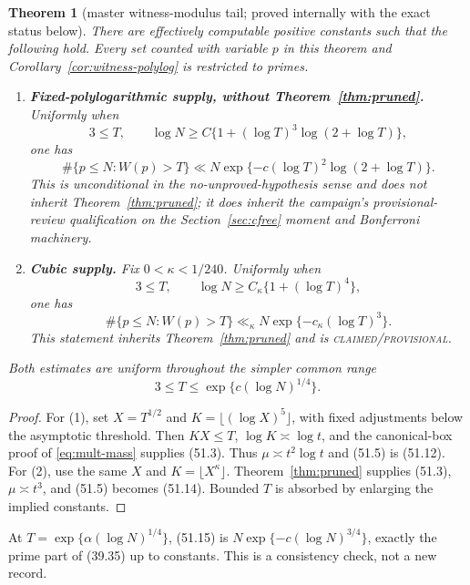 \documentclass[10pt,reqno]{amsart}
\newtheorem{theorem}{Theorem}[section]
\theoremstyle{definition}
\newcommand{\1}{\mathbf 1}
\begin{document}
\begin{theorem}[master witness-modulus tail; proved internally with the
exact status below]\label{thm:witness-tail}
There are effectively computable positive constants such that the following
hold.  Every set counted with variable $p$ in this theorem and
Corollary~\ref{cor:witness-polylog} is restricted to primes.
\begin{enumerate}[leftmargin=*,label=\arabic*.]
\item \textbf{Fixed-polylogarithmic supply, without
Theorem~\ref{thm:pruned}.}  Uniformly when
\begin{equation}\tag{51.12}
 3\leq T,\qquad
 \log N\geq C\{1+(\log T)^3\log(2+\log T)\},
\end{equation}
one has
\begin{equation}\tag{51.13}
 \#\{p\leq N:W(p)>T\}
 \ll N\exp\{-c(\log T)^2\log(2+\log T)\}.
\end{equation}
This is unconditional in the no-unproved-hypothesis sense and does not
inherit Theorem~\ref{thm:pruned}; it does inherit the campaign's
provisional-review qualification on the Section~\ref{sec:cfree} moment and
Bonferroni machinery.
\item \textbf{Cubic supply.}  Fix $0<\kappa<1/240$.  Uniformly when
\begin{equation}\tag{51.14}
 3\leq T,\qquad \log N\geq C_\kappa\{1+(\log T)^4\},
\end{equation}
one has
\begin{equation}\tag{51.15}
 \#\{p\leq N:W(p)>T\}
 \ll_\kappa N\exp\{-c_\kappa(\log T)^3\}.
\end{equation}
This statement inherits Theorem~\ref{thm:pruned} and is
\textsc{claimed/provisional}.
\end{enumerate}
Both estimates are uniform throughout the simpler common range
\begin{equation}\tag{51.16}
                    3\leq T\leq\exp\{c(\log N)^{1/4}\}.
\end{equation}
\end{theorem}
\begin{proof}
For (1), set $X=T^{1/2}$ and
$K=\lfloor(\log X)^5\rfloor$, with fixed adjustments below the asymptotic
threshold.  Then $KX\leq T$, $\log K\asymp\log t$, and the canonical-box
proof of \eqref{eq:mult-mass} supplies (51.3).  Thus
$\mu\asymp t^2\log t$ and (51.5) is (51.12).  For (2), use the same $X$
and $K=\lfloor X^\kappa\rfloor$.  Theorem~\ref{thm:pruned} supplies (51.3),
$\mu\asymp t^3$, and (51.5) becomes (51.14).  Bounded $T$ is absorbed by
enlarging the implied constants.
\end{proof}
At $T=\exp\{\alpha(\log N)^{1/4}\}$, (51.15) is
$N\exp\{-c(\log N)^{3/4}\}$, exactly the prime part of (39.35) up to
constants.  This is a consistency check, not a new record.
\end{document}
